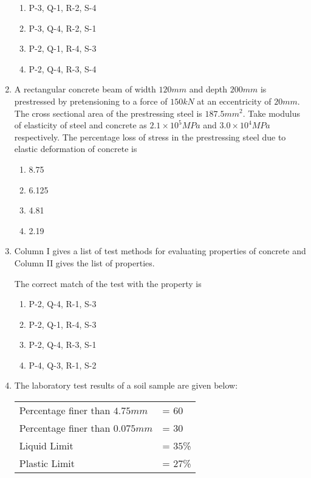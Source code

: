 \documentclass[journal]{IEEEtran}
\begin{document}
\begin{enumerate}[start=25]
\begin{figure}[!ht]
\label{fig:my_label}
\end{figure}
\begin{enumerate}
    \item P-3, Q-1, R-2, S-4
    \item P-3, Q-4, R-2, S-1
    \item P-2, Q-1, R-4, S-3
    \item P-2, Q-4, R-3, S-4
\end{enumerate}
\item A rectangular concrete beam of width $120 mm$ and depth $200 mm$ is prestressed by pretensioning to a force of $150 kN$ at an eccentricity of $20 mm$. The cross sectional area of the prestressing steel is $187.5 mm^2$. Take modulus of elasticity of steel and concrete as $2.1\times10^5 MPa$ and $3.0\times10^4 MPa$ respectively. The percentage loss of stress in the prestressing steel due to elastic deformation of concrete is
\begin{enumerate}
    \item 8.75
    \item 6.125
    \item 4.81
    \item 2.19
\end{enumerate}
\item Column I gives a list of test methods for evaluating properties of concrete and Column II gives the list of properties.
\begin{table}[H]
    \centering
    
    \caption{}
    \label{tab:my_label}
\end{table}
The correct match of the test with the property is
\begin{enumerate}
    \item P-2, Q-4, R-1, S-3
    \item P-2, Q-1, R-4, S-3
    \item P-2, Q-4, R-3, S-1
    \item P-4, Q-3, R-1, S-2
\end{enumerate}
\item The laboratory test results of a soil sample are given below:
\begin{center}
\begin{tabular}{l l}
    Percentage finer than $4.75 mm$ & = $60$ \\
    Percentage finer than $0.075 mm $& = $30$ \\
    Liquid Limit & = $35$\% \\
    Plastic Limit & = $27$\%
\end{tabular}

\end{center}
\end{enumerate}
\end{document}
